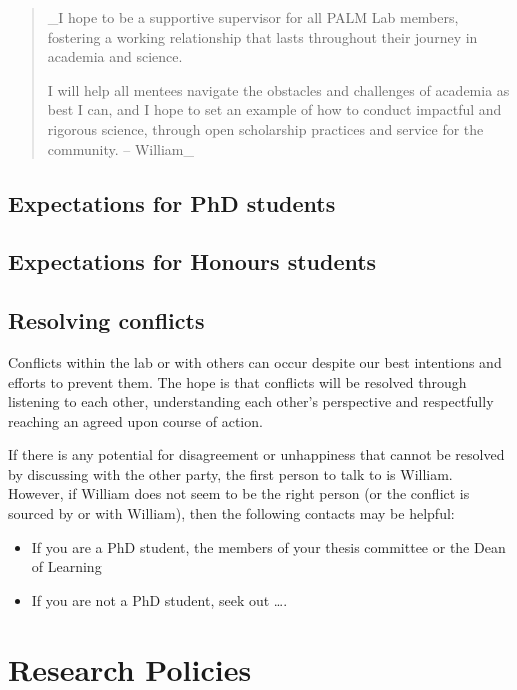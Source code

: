 \documentclass[
]{book}
\providecommand{\tightlist}{%
  \setlength{\itemsep}{0pt}\setlength{\parskip}{0pt}}
\begin{document}
\begin{quote}
\_I hope to be a supportive supervisor for all PALM Lab members, fostering a working relationship that lasts throughout their journey in academia and science.

I will help all mentees navigate the obstacles and challenges of academia as best I can, and I hope to set an example of how to conduct impactful and rigorous science, through open scholarship practices and service for the community. -- William\_
\end{quote}

\hypertarget{expectations-for-phd-students}{%
\section{Expectations for PhD students}\label{expectations-for-phd-students}}

\hypertarget{expectations-for-honours-students}{%
\section{Expectations for Honours students}\label{expectations-for-honours-students}}

\hypertarget{conflicts}{%
\section{Resolving conflicts}\label{conflicts}}

Conflicts within the lab or with others can occur despite our best intentions and efforts to prevent them. The hope is that conflicts will be resolved through listening to each other, understanding each other's perspective and respectfully reaching an agreed upon course of action.

If there is any potential for disagreement or unhappiness that cannot be resolved by discussing with the other party, the first person to talk to is William. However, if William does not seem to be the right person (or the conflict is sourced by or with William), then the following contacts may be helpful:

\begin{itemize}
\tightlist
\item
  If you are a PhD student, the members of your thesis committee or the Dean of Learning
\item
  If you are not a PhD student, seek out \ldots.
\end{itemize}

\hypertarget{research-policies}{%
\chapter{Research Policies}\label{research-policies}}
\end{document}
